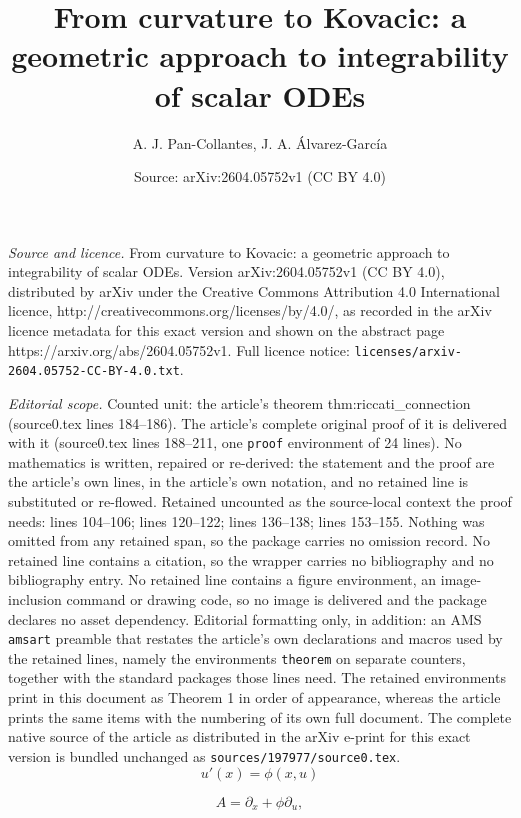 \documentclass[10pt,a4paper]{amsart}
\title{From curvature to Kovacic: a geometric approach to integrability of scalar ODEs}
\author{A. J. Pan-Collantes, J. A. \'Alvarez-Garc\'ia}
\date{Source: arXiv:2604.05752v1 (CC BY 4.0)}
\begin{document}
\maketitle

\noindent\emph{Source and licence.} From curvature to Kovacic: a geometric approach to integrability of scalar ODEs. Version arXiv:2604.05752v1 (CC BY 4.0), distributed by arXiv under the Creative Commons Attribution 4.0 International licence, http://creativecommons.org/licenses/by/4.0/, as recorded in the arXiv licence metadata for this exact version and shown on the abstract page https://arxiv.org/abs/2604.05752v1. Full licence notice: \texttt{licenses/arxiv-2604.05752-CC-BY-4.0.txt}.\par\smallskip

\noindent\textit{Editorial scope.} Counted unit: the article's theorem thm:riccati\_connection (source0.tex lines 184--186). The article's complete original proof of it is delivered with it (source0.tex lines 188--211, one \texttt{proof} environment of 24 lines). No mathematics is written, repaired or re-derived: the statement and the proof are the article's own lines, in the article's own notation, and no retained line is substituted or re-flowed.  Retained uncounted as the source-local context the proof needs: lines 104--106; lines 120--122; lines 136--138; lines 153--155.  Nothing was omitted from any retained span, so the package carries no omission record.  No retained line contains a citation, so the wrapper carries no bibliography and no bibliography entry.  No retained line contains a figure environment, an image-inclusion command or drawing code, so no image is delivered and the package declares no asset dependency.  Editorial formatting only, in addition: an AMS \texttt{amsart} preamble that restates the article's own declarations and macros used by the retained lines, namely the environments \texttt{theorem} on separate counters, together with the standard packages those lines need.  The retained environments print in this document as Theorem 1 in order of appearance, whereas the article prints the same items with the numbering of its own full document.  The complete native source of the article as distributed in the arXiv e-print for this exact version is bundled unchanged as \texttt{sources/197977/source0.tex}.
\begin{equation} \label{eq:ode1}
    u'(x) = \phi(x, u)
\end{equation}

\begin{equation} \label{eq:vector_field}
    A = \partial_x + \phi\partial_u,
\end{equation}
\end{document}
